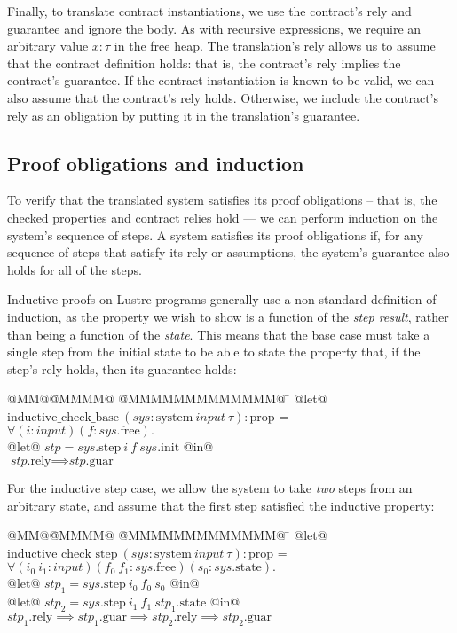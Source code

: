 Finally, to translate contract instantiations, we use the contract's rely and guarantee and ignore the body.
As with recursive expressions, we require an arbitrary value $x: \tau$ in the free heap.
The translation's rely allows us to assume that the contract definition holds: that is, the contract's rely implies the contract's guarantee.
If the contract instantiation is known to be valid, we can also assume that the contract's rely holds.
Otherwise, we include the contract's rely as an obligation by putting it in the translation's guarantee.

\subsection{Proof obligations and induction}
\label{s:transition:ind}

To verify that the translated system satisfies its proof obligations -- that is, the checked properties and contract relies hold --- we can perform induction on the system's sequence of steps.
A system satisfies its proof obligations if, for any sequence of steps that satisfy its rely or assumptions, the system's guarantee also holds for all of the steps.

Inductive proofs on Lustre programs generally use a non-standard definition of induction, as the property we wish to show is a function of the \emph{step result}, rather than being a function of the \emph{state}.
This means that the base case must take a single step from the initial state to be able to state the property that, if the step's rely holds, then its guarantee holds:
\begin{tabbing}
  @MM@\= @MMMM@ \= @MMMMMMMMMMMMM@ \= \kill
  @let@ $\text{inductive_check_base}~(\textit{sys}: \text{system}~\textit{input}~\tau): \text{prop}$ = \\
  \> $\forall (i: \textit{input}) (f: \textit{sys}\text{.free}).$ \\
  \> @let@ $\textit{stp} = \textit{sys}\text{.step}~ i~ f~ \textit{sys}\text{.init}$ @in@ \\
  \> $\textit{stp}\text{.rely} \implies \textit{stp}\text{.guar}$
\end{tabbing}

For the inductive step case, we allow the system to take \emph{two} steps from an arbitrary state, and assume that the first step satisfied the inductive property:
\begin{tabbing}
  @MM@\= @MMMM@ \= @MMMMMMMMMMMMM@ \= \kill
  @let@ $\text{inductive_check_step}~(\textit{sys}: \text{system}~\textit{input}~\tau): \text{prop}$ = \\
  \> $\forall (i_0~ i_1: \textit{input}) (f_0~ f_1: \textit{sys}\text{.free}) (s_0: \textit{sys}\text{.state}).$ \\
  \> @let@ $\textit{stp}_1 = \textit{sys}\text{.step}~ i_0~ f_0~ s_0$ @in@ \\
  \> @let@ $\textit{stp}_2 = \textit{sys}\text{.step}~ i_1~ f_1~ \textit{stp}_1\text{.state}$ @in@ \\
  \> $\textit{stp}_1\text{.rely} \implies \textit{stp}_1\text{.guar} \implies \textit{stp}_2\text{.rely} \implies \textit{stp}_2\text{.guar}$
\end{tabbing}

